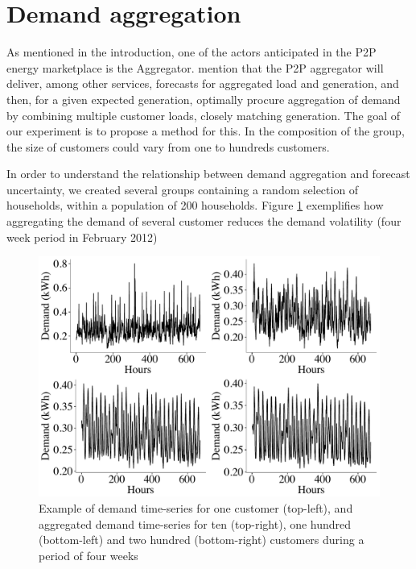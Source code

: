\documentclass[preprint,3p,11pt,authoryear]{elsarticle}
\begin{document}
\section{Demand aggregation}
\label{sec:load_aggr}
As mentioned in the introduction, one of the actors anticipated in the P2P energy marketplace is the Aggregator. \citet{pouttu2017p2p} mention that the P2P aggregator will deliver, among other services, forecasts for aggregated load and generation, and then, for a given expected generation, optimally procure aggregation of demand by combining multiple customer loads, closely matching generation. The goal of our experiment is to propose a method for this. In the composition of the group, the size of customers could vary from one to hundreds customers.

In order to understand the relationship between demand aggregation and forecast uncertainty, we created several groups containing a random selection of households, within a population of 200 households.
Figure \ref{fig:4weeksaggr} exemplifies how aggregating the demand of several customer reduces the demand volatility (four week period in February 2012)

\begin{figure}
  \centering
  \includegraphics[scale=0.5]{2017-10-13_compare_aggrdemands}
  \caption{Example of demand time-series for one customer (top-left), and aggregated demand time-series for ten (top-right), one hundred (bottom-left) and two hundred (bottom-right) customers during a period of four weeks}
  \label{fig:4weeksaggr}
\end{figure}
\end{document}
